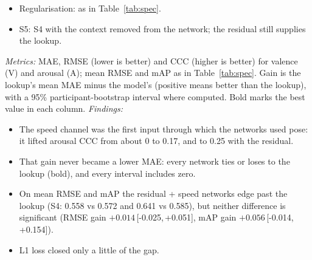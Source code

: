 \documentclass[11pt]{article}
\newcommand{\ci}[2]{\,[#1,\,#2]}
\begin{document}
\begin{table}[!htbp]
{\begin{itemize}
  \item Regularisation: as in Table~\ref{tab:spec}.
  \item S5: S4 with the context removed from the network; the residual still supplies the lookup.
\end{itemize}
\emph{Metrics:} MAE, RMSE (lower is better) and CCC (higher is better) for valence (V) and arousal (A); mean RMSE and mAP as in Table~\ref{tab:spec}. Gain is the lookup's mean MAE minus the model's (positive means better than the lookup), with a 95\% participant-bootstrap interval where computed. Bold marks the best value in each column.
\emph{Findings:}
\begin{itemize}
  \item The speed channel was the first input through which the networks used pose: it lifted arousal CCC from about 0 to 0.17, and to 0.25 with the residual.
  \item That gain never became a lower MAE: every network ties or loses to the lookup (bold), and every interval includes zero.
  \item On mean RMSE and mAP the residual + speed networks edge past the lookup (S4: 0.558 vs 0.572 and 0.641 vs 0.585), but neither difference is significant (RMSE gain $+0.014$\ci{-0.025}{+0.051}, mAP gain $+0.056$\ci{-0.014}{+0.154}).
  \item L1 loss closed only a little of the gap.
\end{itemize}}
\end{table}
\end{document}
